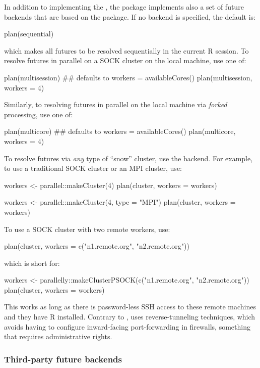 In addition to implementing the , the  package
implements also a set of future backends that are based on
the  package.  If no backend is specified, the default
is:
\begin{example}
plan(sequential)
\end{example}
which makes all futures to be resolved sequentially in the current R
session.
%
To resolve futures in parallel on a SOCK cluster on the local machine,
use one of:
\begin{example}
plan(multisession) ## defaults to workers = availableCores()
plan(multisession, workers = 4)
\end{example}
%
Similarly, to resolving futures in parallel on the local machine via
\emph{forked} processing, use one of:
\begin{example}
plan(multicore) ## defaults to workers = availableCores()
plan(multicore, workers = 4)
\end{example}
%
To resolve futures via \emph{any} type of ``snow'' cluster, use
the  backend.  For example, to use a traditional SOCK
cluster or an MPI cluster, use:
\begin{example}
workers <- parallel::makeCluster(4)
plan(cluster, workers = workers)

workers <- parallel::makeCluster(4, type = "MPI")
plan(cluster, workers = workers)
\end{example}
To use a SOCK cluster with two remote workers, use:
\begin{example}
plan(cluster, workers = c("n1.remote.org", "n2.remote.org"))
\end{example}
which is short for:
\begin{example}
workers <- parallelly::makeClusterPSOCK(c("n1.remote.org", "n2.remote.org"))
plan(cluster, workers = workers)
\end{example}
This works as long as there is password-less SSH access to these
remote machines and they have R installed.  Contrary to
,
 uses reverse-tunneling
techniques, which avoids having to configure inward-facing
port-forwarding in firewalls, something that requires administrative
rights.


\subsubsection{Third-party future backends}

